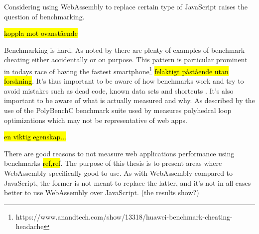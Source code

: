Considering using WebAssembly to replace certain type of JavaScript raises the question of benchmarking. 

\hl{koppla mot ovanstående}


Benchmarking is hard. As noted by \textcite{CaiNerurkarWu1998} there are plenty of examples of benchmark cheating either accidentally or on purpose. This pattern is particular prominent in todays race of having the fastest smartphone\footnote{https://www.anandtech.com/show/13318/huawei-benchmark-cheating-headache} \hl{felaktigt påstående utan forskning}. It's thus important to be aware of how benchmarks work and try to avoid mistakes such as dead code, known data sets and shortcuts \parencite{CaiNerurkarWu1998}. It's also important to be aware of what is actually measured and why. As described by \textcite{JangdaPowersGuhaBerger2019} the use of the PolyBenchC benchmark suite used by \textcite{HaasRossbergSchuffTitzerHolmanGohmanWagnerZakaiBastien2017} measures polyhedral loop optimizations which may not be representative of web apps.

\hl{en viktig egenskap...}

There are good reasons to not measure web applications performance using benchmarks \hl{ref,ref}. The purpose of this thesis is to present areas where WebAssembly specifically good to use. As with WebAssembly compared to JavaScript, the former is not meant to replace the latter, and it's not in all cases better to use WebAssembly over JavaScript. (the results show?)

